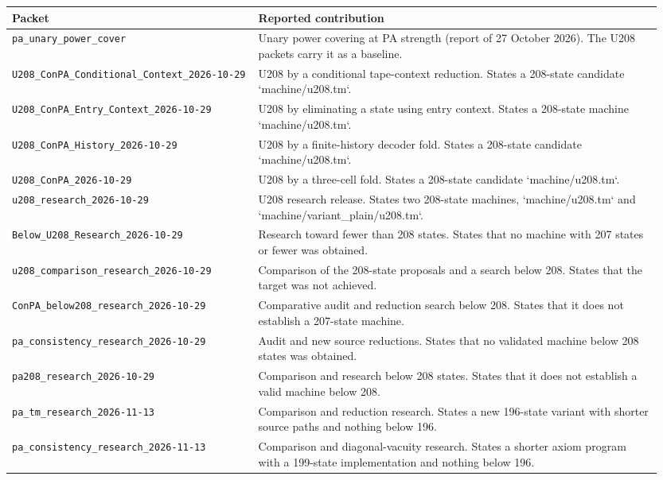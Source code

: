 \begin{longtable}{@{}p{0.36\linewidth}p{0.59\linewidth}@{}}
\toprule Packet & Reported contribution\\\midrule\endhead
\nolinkurl{pa_unary_power_cover} & Unary power covering at PA strength (report of 27 October 2026). The U208 packets carry it as a baseline.\\[4pt]
\nolinkurl{U208_ConPA_Conditional_Context_2026-10-29} & U208 by a conditional tape-context reduction. States a 208-state candidate `machine/u208.tm`.\\[4pt]
\nolinkurl{U208_ConPA_Entry_Context_2026-10-29} & U208 by eliminating a state using entry context. States a 208-state machine `machine/u208.tm`.\\[4pt]
\nolinkurl{U208_ConPA_History_2026-10-29} & U208 by a finite-history decoder fold. States a 208-state candidate `machine/u208.tm`.\\[4pt]
\nolinkurl{U208_ConPA_2026-10-29} & U208 by a three-cell fold. States a 208-state candidate `machine/u208.tm`.\\[4pt]
\nolinkurl{u208_research_2026-10-29} & U208 research release. States two 208-state machines, `machine/u208.tm` and `machine/variant\_plain/u208.tm`.\\[4pt]
\nolinkurl{Below_U208_Research_2026-10-29} & Research toward fewer than 208 states. States that no machine with 207 states or fewer was obtained.\\[4pt]
\nolinkurl{u208_comparison_research_2026-10-29} & Comparison of the 208-state proposals and a search below 208. States that the target was not achieved.\\[4pt]
\nolinkurl{ConPA_below208_research_2026-10-29} & Comparative audit and reduction search below 208. States that it does not establish a 207-state machine.\\[4pt]
\nolinkurl{pa_consistency_research_2026-10-29} & Audit and new source reductions. States that no validated machine below 208 states was obtained.\\[4pt]
\nolinkurl{pa208_research_2026-10-29} & Comparison and research below 208 states. States that it does not establish a valid machine below 208.\\[4pt]
\nolinkurl{pa_tm_research_2026-11-13} & Comparison and reduction research. States a new 196-state variant with shorter source paths and nothing below 196.\\[4pt]
\nolinkurl{pa_consistency_research_2026-11-13} & Comparison and diagonal-vacuity research. States a shorter axiom program with a 199-state implementation and nothing below 196.\\[4pt]

\end{longtable}

